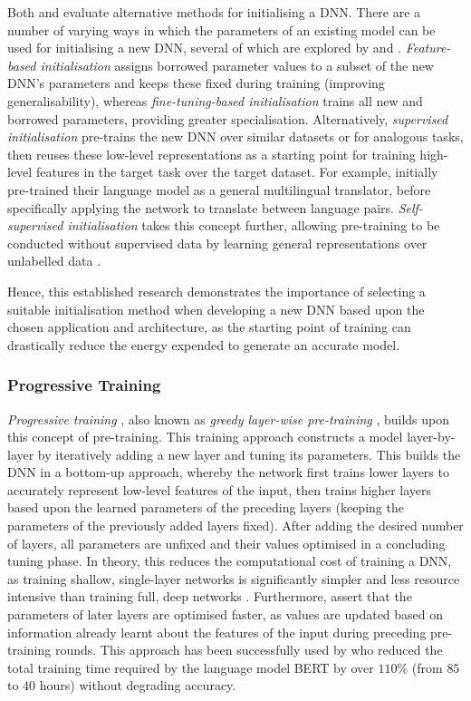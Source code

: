 \documentclass[a4paper, 11pt]{report}
\begin{document}
    Both \citet{hanin-2018} and \citet{xu-2021} evaluate alternative methods for initialising a DNN. There are a number of varying ways in which the parameters of an existing model can be used for initialising a new DNN, several of which are explored by\citet{hanin-2018} and \citet{xu-2021}. \emph{Feature-based initialisation} assigns borrowed parameter values to a subset of the new DNN's parameters and keeps these fixed during training (improving generalisability), whereas \emph{fine-tuning-based initialisation} trains all new and borrowed parameters, providing greater specialisation. Alternatively, \emph{supervised initialisation} pre-trains the new DNN over similar datasets or for analogous tasks, then reuses these low-level representations as a starting point for training high-level features in the target task over the target dataset. For example, \citet{lin-2021} initially pre-trained their language model as a general multilingual translator, before specifically applying the network to translate between language pairs. \emph{Self-supervised initialisation} takes this concept further, allowing pre-training to be conducted without supervised data by learning general representations over unlabelled data \citep{peters-2018}.

    Hence, this established research demonstrates the importance of selecting a suitable initialisation method when developing a new DNN based upon the chosen application and architecture, as the starting point of training can drastically reduce the energy expended to generate an accurate model.


    \subsubsection{Progressive Training}
    \label{section: progressive-training}

    \emph{Progressive training} \citep{xu-2021}, also known as \emph{greedy layer-wise pre-training} \citep{xu-2018}, builds upon this concept of pre-training. This training approach constructs a model layer-by-layer by iteratively adding a new layer and tuning its parameters. This builds the DNN in a bottom-up approach, whereby the network first trains lower layers to accurately represent low-level features of the input, then trains higher layers based upon the learned parameters of the preceding layers (keeping the parameters of the previously added layers fixed). After adding the desired number of layers, all parameters are unfixed and their values optimised in a concluding tuning phase. In theory, this reduces the computational cost of training a DNN, as training shallow, single-layer networks is significantly simpler and less resource intensive than training full, deep networks \citep{xu-2021}. Furthermore, \citet{xu-2021} assert that the parameters of later layers are optimised faster, as values are updated based on information already learnt about the features of the input during preceding pre-training rounds. This approach has been successfully used by \citet{yang-2020} who reduced the total training time required by the language model BERT by over $110\%$ (from $85$ to $40$ hours) without degrading accuracy.
\end{document}
